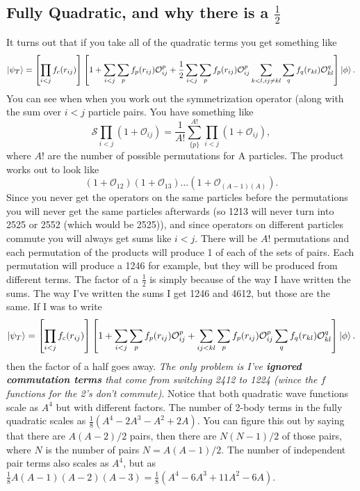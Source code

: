 \subsection{Fully Quadratic, and why there is a $\frac{1}{2}$}
It turns out that if you take all of the quadratic terms you get something like
\begin{equation}
   \left| \psi_T \right> = \left[\prod\limits_{i<j}f_c(r_{ij})\right] \left[1+\sum\limits_{i<j}\sum\limits_p f_p(r_{ij})\mathcal{O}_{ij}^p + \frac{1}{2}\sum\limits_{i<j}\sum\limits_p f_p(r_{ij})\mathcal{O}_{ij}^p\sum\limits_{k<l,ij\ne kl}\sum\limits_q f_q(r_{kl})\mathcal{O}_{kl}^q\right] \left| \phi \right>.
\end{equation}
You can see when when you work out the symmetrization operator (along with the sum over $i<j$ particle pairs. You have something like
\begin{equation}
   \mathcal{S} \prod\limits_{i<j} \left(1+\mathcal{O}_{ij}\right) = \frac{1}{A!}\sum\limits_{\{p\}}^{A!}\prod\limits_{i<j} \left(1+\mathcal{O}_{ij}\right),
\end{equation}
where $A!$ are the number of possible permutations for A particles. The product works out to look like
\begin{equation}
   (1+\mathcal{O}_{12})(1+\mathcal{O}_{13})\ldots(1+\mathcal{O}_{(A-1)(A)}).
\end{equation}
Since you never get the operators on the same particles before the permutations you will never get the same particles afterwards (so 1213 will never turn into 2525 or 2552 (which would be 2525)), and since operators on different particles commute you will always get sums like $i<j$. There will be $A!$ permutations and each permutation of the products will produce 1 of each of the sets of pairs. Each permutation will produce a 1246 for example, but they will be produced from different terms. The factor of a $\frac{1}{2}$ is simply because of the way I have written the sums. The way I've written the sums I get 1246 and 4612, but those are the same. If I was to write 
\begin{equation}
   \left| \psi_T \right> = \left[\prod\limits_{i<j}f_c(r_{ij})\right] \left[1+\sum\limits_{i<j}\sum\limits_p f_p(r_{ij})\mathcal{O}_{ij}^p + \sum\limits_{ij<kl}\sum\limits_p f_p(r_{ij})\mathcal{O}_{ij}^p \sum\limits_q f_q(r_{kl})\mathcal{O}_{kl}^q\right] \left| \phi \right>.
\end{equation}
then the factor of a half goes away. \textit{The only problem is I've \textbf{ignored commutation terms} that come from switching 2412 to 1224 (wince the $f$ functions for the 2's don't commute)}. Notice that both quadratic wave functions scale as $A^4$ but with different factors. The number of 2-body terms in the fully quadratic scales as $\frac{1}{8}(A^4-2A^3-A^2+2A)$. You can figure this out by saying that there are $A(A-2)/2$ pairs, then there are $N(N-1)/2$ of those pairs, where $N$ is the number of pairs $N=A(A-1)/2$. The number of independent pair terms also scales as $A^4$, but as $\frac{1}{8}A(A-1)(A-2)(A-3)=\frac{1}{8}(A^4-6A^3+11A^2-6A)$.
